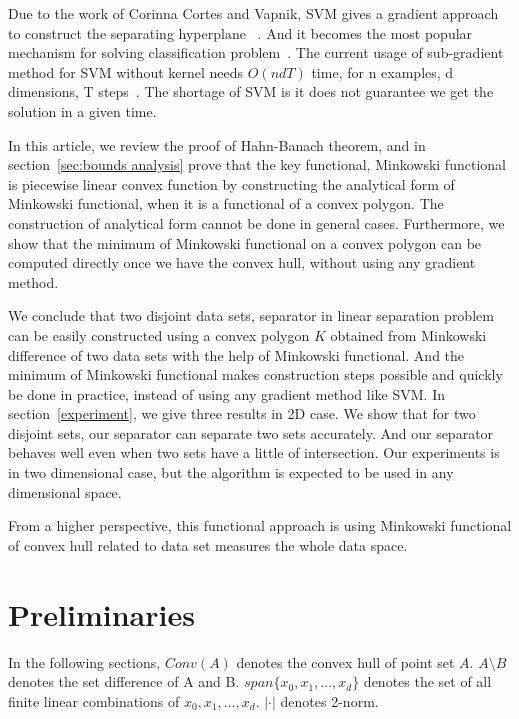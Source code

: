 \documentclass{article}
\newcommand{\abs}[1]{\left\lvert#1\right\rvert}
\begin{document}
Due to the work of Corinna Cortes and Vapnik, SVM gives a gradient approach to construct the separating hyperplane
~\cite{cortes1995support}. And it becomes the most popular mechanism for solving classification problem~\cite{bishop2006pattern}. The 
current usage of sub-gradient method for SVM without kernel needs $O(ndT)$ time, for n examples, d dimensions, T steps~\cite{9520}. The 
shortage of SVM is it does not guarantee we get the solution in a given time. \par

In this article, we review the proof of Hahn-Banach theorem, and in section~\ref{sec:bounds analysis} prove that the key functional, 
Minkowski functional is piecewise linear convex function by constructing the analytical form of Minkowski functional, when it is a 
functional of a convex polygon. The construction of analytical form cannot be done in general cases. Furthermore, we show that the 
minimum of Minkowski functional on a convex polygon can be computed directly once we have the convex hull, without using any gradient 
method.\par

We conclude that two disjoint data sets, separator in linear separation problem can be easily constructed using a convex polygon $K$ 
obtained from Minkowski difference of two data sets with the help of Minkowski functional. And the minimum of Minkowski functional makes construction steps 
possible and quickly be done in practice, instead of using any gradient method like SVM.
In section~\ref{experiment}, we give three results in 2D case. We show that for two disjoint sets, our separator can separate two sets accurately. And our
separator behaves well even when two sets have a little of intersection. Our experiments is in two dimensional case, but the algorithm is expected to be used 
in any dimensional space.\par

From a higher perspective, this functional approach is using Minkowski functional of convex hull related to data set measures the whole data space.\par

\section{Preliminaries}
In the following sections, $Conv(A)$ denotes the convex hull of point set $A$. $A\setminus B$ denotes the set difference of A and B. 
$span\{x_0,x_1,\dots,x_d\}$ denotes the set of all finite linear combinations of $x_0,x_1,\dots,x_d$. $\abs{\cdot}$ denotes 2-norm.\par
\end{document}
